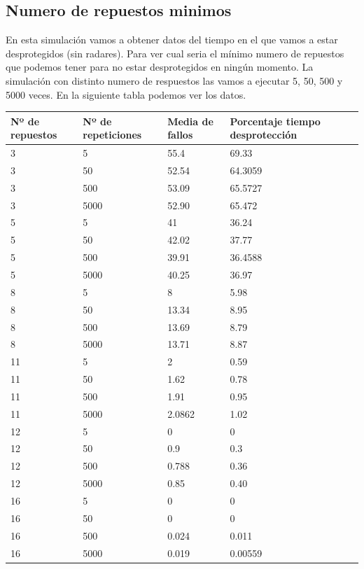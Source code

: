 \documentclass[12pt,a4paper]{article}
\begin{document}
\subsection{Numero de repuestos minimos}
En esta simulación vamos a obtener datos del tiempo en el que vamos a estar desprotegidos (sin radares). Para ver cual seria el mínimo numero de repuestos que podemos tener para no estar desprotegidos en ningún momento. La simulación con distinto numero de respuestos las vamos a ejecutar 5, 50, 500 y 5000 veces. En la siguiente tabla podemos ver los datos.
\begin{tabular}{|l|l|l|l|l|}
	\hline 
	Nº de repuestos & Nº de repeticiones & Media de fallos & Porcentaje tiempo desprotección \\ 
	\hline 
		\hline 
	3 & 5 & 55.4 & 69.33  \\ 
	3 & 50 & 52.54 & 64.3059   \\ 
	3 & 500 & 53.09 & 65.5727  \\ 
	3 & 5000 &  52.90 & 65.472  \\ 
	\hline 
		\hline
	5 & 5 & 41& 36.24  \\ 
	5 & 50 & 42.02 & 37.77   \\ 
	5 & 500 & 39.91 & 36.4588  \\ 
	5 & 5000 &  40.25 & 36.97  \\ 
	\hline 
		\hline
	8 & 5 & 8& 5.98  \\ 
	8 & 50 & 13.34 & 8.95   \\ 
	8 & 500 & 13.69 & 8.79  \\ 
	8 & 5000 &  13.71 & 8.87  \\ 
	\hline
	\hline
	11 & 5 & 2& 0.59  \\ 
	11 & 50 & 1.62 & 0.78   \\ 
	11 & 500 & 1.91 & 0.95  \\ 
	11 & 5000 &  2.0862 & 1.02 \\ 
	\hline
	\hline
		12 & 5 & 0& 0  \\ 
	12 & 50 & 0.9 & 0.3   \\ 
	12 & 500 & 0.788 & 0.36  \\ 
	12 & 5000 &  0.85 & 0.40 \\ 
	 
	\hline   
	\hline
	16 & 5 & 0& 0  \\ 
	16 & 50 & 0 & 0   \\ 
	16 & 500 & 0.024 & 0.011  \\ 
	16 & 5000 &  0.019 & 0.00559 \\
	\hline 
\end{tabular}
\end{document}
